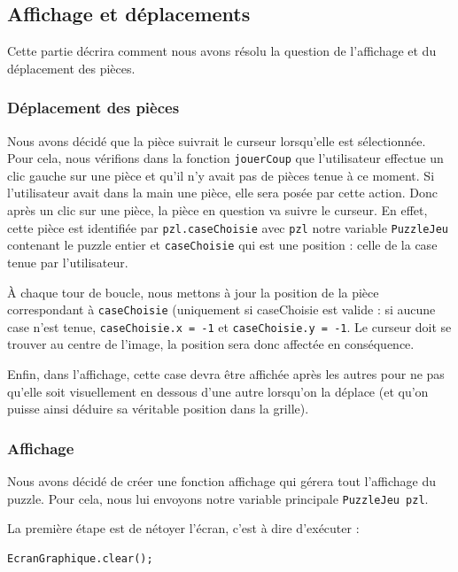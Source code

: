 \documentclass[]{article}
\newcommand{\variable}[1]{\noindent \texttt{#1}}
\begin{document}
\subsection{Affichage et déplacements}

Cette partie décrira comment nous avons résolu la question de l'affichage et du déplacement des pièces.

\subsubsection{Déplacement des pièces}

Nous avons décidé que la pièce suivrait le curseur lorsqu'elle est sélectionnée. Pour cela, nous vérifions dans la fonction \variable{jouerCoup} que l'utilisateur effectue un clic gauche sur une pièce et qu'il n'y avait pas de pièces tenue à ce moment. Si l'utilisateur avait dans la main une pièce, elle sera posée par cette action. Donc après un clic sur une pièce, la pièce en question va suivre le curseur. En effet, cette pièce est identifiée par \variable{pzl.caseChoisie} avec \variable{pzl} notre variable \variable{PuzzleJeu} contenant le puzzle entier et \variable{caseChoisie} qui est une position : celle de la case tenue par l'utilisateur.

À chaque tour de boucle, nous mettons à jour la position de la pièce correspondant à \variable{caseChoisie} (uniquement si caseChoisie est valide : si aucune case n'est tenue, \variable{caseChoisie.x = -1} et \variable{caseChoisie.y = -1}. Le curseur doit se trouver au centre de l'image, la position sera donc affectée en conséquence.

Enfin, dans l'affichage, cette case devra être affichée après les autres pour ne pas qu'elle soit visuellement en dessous d'une autre lorsqu'on la déplace (et qu'on puisse ainsi déduire sa véritable position dans la grille).

\subsubsection{Affichage}

Nous avons décidé de créer une fonction affichage qui gérera tout l'affichage du puzzle. Pour cela, nous lui envoyons notre variable principale \variable{PuzzleJeu pzl}.

La première étape est de nétoyer l'écran, c'est à dire d'exécuter : 
\begin{lstlisting}
EcranGraphique.clear();
\end{lstlisting}
\end{document}
